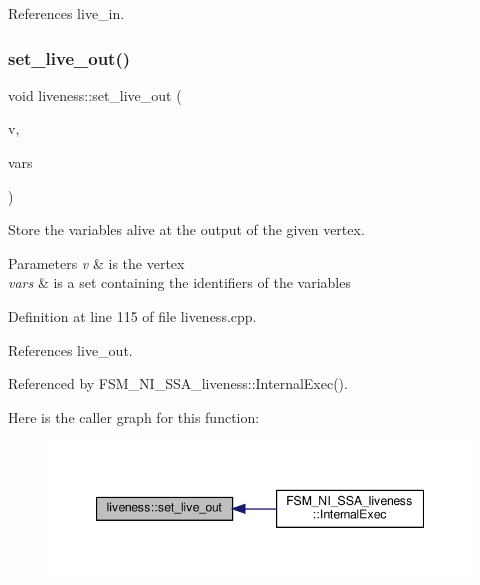 References live\+\_\+in.

\mbox{\label{classliveness_adaebdad5db79d709d99b59d8c35f3d0e}} 
\subsubsection{\texorpdfstring{set\+\_\+live\+\_\+out()}{set\_live\_out()}\hspace{0.1cm}{\footnotesize\ttfamily [1/3]}}
{\footnotesize\ttfamily void liveness\+::set\+\_\+live\+\_\+out (\begin{DoxyParamCaption}\item[{const \hyperlink{graph_8hpp_abefdcf0544e601805af44eca032cca14}{vertex} \&}]{v,  }\item[{const \hyperlink{classCustomOrderedSet}{Custom\+Ordered\+Set}$<$ unsigned int $>$ \&}]{vars }\end{DoxyParamCaption})}



Store the variables alive at the output of the given vertex. 


\begin{DoxyParams}{Parameters}
{\em v} & is the vertex \\
\hline
{\em vars} & is a set containing the identifiers of the variables \\
\hline
\end{DoxyParams}


Definition at line 115 of file liveness.\+cpp.



References live\+\_\+out.



Referenced by F\+S\+M\+\_\+\+N\+I\+\_\+\+S\+S\+A\+\_\+liveness\+::\+Internal\+Exec().

Here is the caller graph for this function\+:
\nopagebreak
\begin{figure}[H]
\begin{center}
\leavevmode
\includegraphics[width=347pt]{d3/d1f/classliveness_adaebdad5db79d709d99b59d8c35f3d0e_icgraph}
\end{center}
\end{figure}
\mbox{\label{classliveness_a1089eafff6d5dac4ee2338817f6e8744}} 
